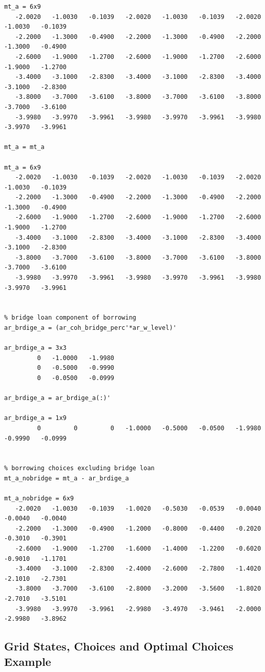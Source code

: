 \documentclass[
]{book}
\begin{document}
\begin{verbatim}
mt_a = 6x9    
   -2.0020   -1.0030   -0.1039   -2.0020   -1.0030   -0.1039   -2.0020   -1.0030   -0.1039
   -2.2000   -1.3000   -0.4900   -2.2000   -1.3000   -0.4900   -2.2000   -1.3000   -0.4900
   -2.6000   -1.9000   -1.2700   -2.6000   -1.9000   -1.2700   -2.6000   -1.9000   -1.2700
   -3.4000   -3.1000   -2.8300   -3.4000   -3.1000   -2.8300   -3.4000   -3.1000   -2.8300
   -3.8000   -3.7000   -3.6100   -3.8000   -3.7000   -3.6100   -3.8000   -3.7000   -3.6100
   -3.9980   -3.9970   -3.9961   -3.9980   -3.9970   -3.9961   -3.9980   -3.9970   -3.9961

mt_a = mt_a

mt_a = 6x9    
   -2.0020   -1.0030   -0.1039   -2.0020   -1.0030   -0.1039   -2.0020   -1.0030   -0.1039
   -2.2000   -1.3000   -0.4900   -2.2000   -1.3000   -0.4900   -2.2000   -1.3000   -0.4900
   -2.6000   -1.9000   -1.2700   -2.6000   -1.9000   -1.2700   -2.6000   -1.9000   -1.2700
   -3.4000   -3.1000   -2.8300   -3.4000   -3.1000   -2.8300   -3.4000   -3.1000   -2.8300
   -3.8000   -3.7000   -3.6100   -3.8000   -3.7000   -3.6100   -3.8000   -3.7000   -3.6100
   -3.9980   -3.9970   -3.9961   -3.9980   -3.9970   -3.9961   -3.9980   -3.9970   -3.9961


% bridge loan component of borrowing
ar_brdige_a = (ar_coh_bridge_perc'*ar_w_level)'

ar_brdige_a = 3x3    
         0   -1.0000   -1.9980
         0   -0.5000   -0.9990
         0   -0.0500   -0.0999

ar_brdige_a = ar_brdige_a(:)'

ar_brdige_a = 1x9    
         0         0         0   -1.0000   -0.5000   -0.0500   -1.9980   -0.9990   -0.0999


% borrowing choices excluding bridge loan
mt_a_nobridge = mt_a - ar_brdige_a

mt_a_nobridge = 6x9    
   -2.0020   -1.0030   -0.1039   -1.0020   -0.5030   -0.0539   -0.0040   -0.0040   -0.0040
   -2.2000   -1.3000   -0.4900   -1.2000   -0.8000   -0.4400   -0.2020   -0.3010   -0.3901
   -2.6000   -1.9000   -1.2700   -1.6000   -1.4000   -1.2200   -0.6020   -0.9010   -1.1701
   -3.4000   -3.1000   -2.8300   -2.4000   -2.6000   -2.7800   -1.4020   -2.1010   -2.7301
   -3.8000   -3.7000   -3.6100   -2.8000   -3.2000   -3.5600   -1.8020   -2.7010   -3.5101
   -3.9980   -3.9970   -3.9961   -2.9980   -3.4970   -3.9461   -2.0000   -2.9980   -3.8962
\end{verbatim}

\hypertarget{grid-states-choices-and-optimal-choices-example}{%
\subsection{Grid States, Choices and Optimal Choices Example}\label{grid-states-choices-and-optimal-choices-example}}
\end{document}
